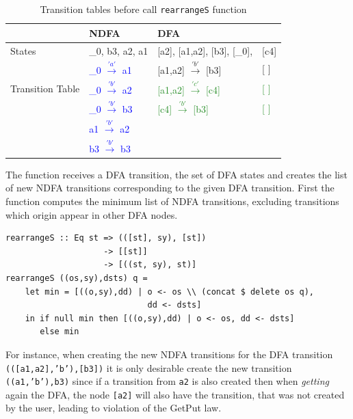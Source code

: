 \begin{table}
  \begin{center}
    \begin{tabular}{ | p{3cm} |p{4cm}||p{3cm} p{1cm} |  }
    \hline
         & NDFA & DFA & \\ [1ex]
        \hline
        States & \_0, b3, a2, a1 & [a2], [a1,a2], [b3], [\_0], & [c4]\\ [0.7ex]
        \hline
        \multirow{3}{5em}{Transition Table} & \textcolor{blue}{\_0 $\xrightarrow{'a'}$ a1} & [a1,a2]  $\xrightarrow{'b'}$ [b3] & [ ]\\
        & \textcolor{blue}{\_0 $\xrightarrow{'b'}$ a2} & \textcolor{ForestGreen}{[a1,a2]  $\xrightarrow{'c'}$ [c4]} & \textcolor{ForestGreen}{[ ]}\\
        & \textcolor{blue}{\_0 $\xrightarrow{'b'}$ b3} & \textcolor{ForestGreen}{[c4]  $\xrightarrow{'b'}$ [b3]} & \textcolor{ForestGreen}{[ ]}\\
        & \textcolor{blue}{a1  $\xrightarrow{'b'}$ a2} & & \\
        & \textcolor{blue}{b3  $\xrightarrow{'b'}$ b3} & & \\
        \hline
        \end{tabular}
  \end{center}
  \caption{Transition tables before call \texttt{rearrangeS} function}
  \label{getTable3}
\end{table}

The function receives a DFA transition, the set of DFA states and creates the list of new NDFA transitions corresponding to the given DFA transition. 
First the function computes the minimum list of NDFA transitions, excluding transitions which origin appear in other DFA nodes. 

\begin{verbatim}
rearrangeS :: Eq st => (([st], sy), [st])
                    -> [[st]] 
                    -> [((st, sy), st)]
rearrangeS ((os,sy),dsts) q = 
    let min = [((o,sy),dd) | o <- os \\ (concat $ delete os q), 
                             dd <- dsts]
    in if null min then [((o,sy),dd) | o <- os, dd <- dsts]
       else min 
\end{verbatim}

For instance, when creating the new NDFA transitions for the DFA transition \texttt{(([a1,a2],'b'),[b3])} it is only desirable create the new transition \texttt{((a1,'b'),b3)} since if a transition from \texttt{a2} is also created then when \textit{getting} again the DFA, the node \texttt{[a2]} will also have the transition, that was not created by the user, leading to violation of the GetPut law. 

